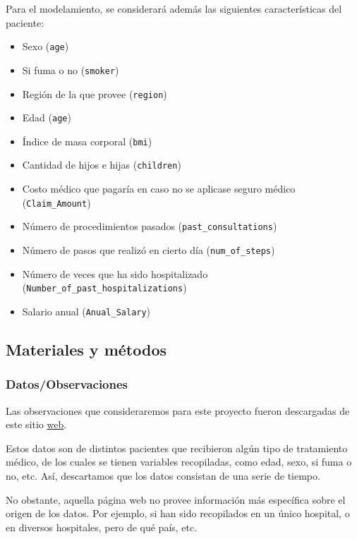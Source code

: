 \documentclass[
]{article}
\providecommand{\tightlist}{%
  \setlength{\itemsep}{0pt}\setlength{\parskip}{0pt}}
\begin{document}
Para el modelamiento, se considerará además las siguientes
características del paciente:

\begin{itemize}
\tightlist
\item
  Sexo (\texttt{age})
\item
  Si fuma o no (\texttt{smoker})
\item
  Región de la que provee (\texttt{region})
\item
  Edad (\texttt{age})
\item
  Índice de masa corporal (\texttt{bmi})
\item
  Cantidad de hijos e hijas (\texttt{children})
\item
  Costo médico que pagaría en caso no se aplicase seguro médico
  (\texttt{Claim\_Amount})
\item
  Número de procedimientos pasados (\texttt{past\_consultations})
\item
  Número de pasos que realizó en cierto día (\texttt{num\_of\_steps})
\item
  Número de veces que ha sido hospitalizado
  (\texttt{Number\_of\_past\_hospitalizations})
\item
  Salario anual (\texttt{Anual\_Salary})
\end{itemize}

\subsection{Materiales y métodos}\label{materiales-y-muxe9todos}

\subsubsection{Datos/Observaciones}\label{datosobservaciones}

Las observaciones que consideraremos para este proyecto fueron
descargadas de este sitio
\href{https://www.kaggle.com/datasets/shubhamsingh57/ml-model-practice-linear-regression/data}{web}.

Estos datos son de distintos pacientes que recibieron algún tipo de
tratamiento médico, de los cuales se tienen variables recopiladas, como
edad, sexo, si fuma o no, etc. Así, descartamos que los datos consistan
de una serie de tiempo.

No obstante, aquella página web no provee información más específica
sobre el origen de los datos. Por ejemplo, si han sido recopilados en un
único hospital, o en diversos hospitales, pero de qué país, etc.
\end{document}
